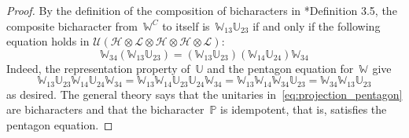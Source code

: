 \documentclass[a4paper]{amsart}
\numberwithin{equation}{section}
\theoremstyle{plain}
\numberwithin{theorem}{section}
\theoremstyle{definition}
\theoremstyle{remark}
\newcommand*{\Corep}[1]{\mathbb{#1}}          %
\newcommand*{\Multunit}[1][]{\mathbb W^{#1}}%
\newcommand*{\ProjBichar}{\mathbb{P}}%
\newcommand*{\Hils}[1][H]{\mathcal{#1}}%
\newcommand*{\U}{\mathcal U}%
\begin{document}
\begin{proof}
  By the definition of the composition of bicharacters in
  \cite{Meyer-Roy-Woronowicz:Homomorphisms}*{Definition 3.5}, the
  composite bicharacter from~\(\Multunit[C]\)
  to itself is~\(\Multunit_{13}\Corep{U}_{23}\)
  if and only if the following equation holds
  in
  \(\U(\Hils\otimes\Hils[L]\otimes\Hils\otimes\Hils\otimes\Hils[L])\):
  \[
  \Multunit_{34} (\Multunit_{13} \Corep{U}_{23})
  = (\Multunit_{13} \Corep{U}_{23})
  (\Multunit_{14} \Corep{U}_{24}) \Multunit_{34}
  \]
  Indeed, the representation property of~\(\Corep{U}\)
  and the pentagon equation for~\(\Multunit\) give
  \[
  \Multunit_{13} \Corep{U}_{23} \Multunit_{14} \Corep{U}_{24}
  \Multunit_{34}
  = \Multunit_{13} \Multunit_{14} \Corep{U}_{23} \Corep{U}_{24}
  \Multunit_{34}
  = \Multunit_{13} \Multunit_{14} \Multunit_{34} \Corep{U}_{23}
  = \Multunit_{34} \Multunit_{13} \Corep{U}_{23}
  \]
  as desired.  The general theory says that the unitaries
  in~\eqref{eq:projection_pentagon} are
  bicharacters and that the bicharacter~\(\ProjBichar\) is idempotent,
  that is, satisfies the pentagon equation.
\end{proof}
\end{document}
